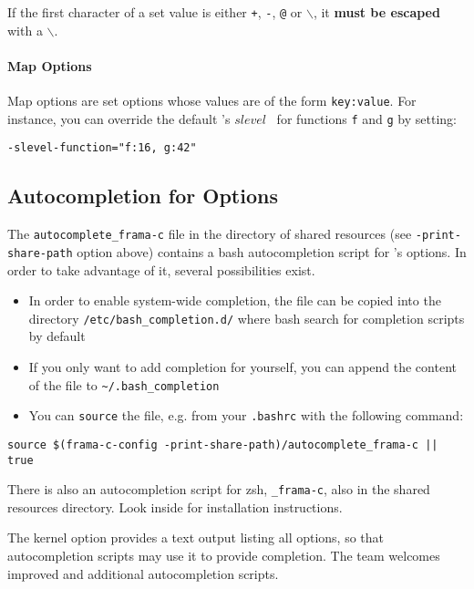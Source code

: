 \begin{important}
If the first character of a set value is either \texttt{+}, \texttt{-},
\texttt{@} or $\backslash$, it \textbf{must be escaped} with a $\backslash$.
\end{important}

\paragraph{Map Options}

Map options are set options whose values are of the form \texttt{key:value}. For
instance, you can override the default \Value's $slevel$~\cite{value} for
functions \texttt{f} and \texttt{g} by setting:
\begin{commands}
\texttt{-slevel-function="f:16, g:42"}
\end{commands}

\subsection{Autocompletion for Options}

The \texttt{autocomplete\_frama-c} file in the directory of shared resources
(see \texttt{-print-share-path} option above) contains a
bash autocompletion script for \FramaC's options. In order to take advantage
of it, several possibilities exist.
\begin{itemize}
\item In order to enable system-wide completion, the file can be copied
  into the directory \texttt{/etc/bash\_completion.d/} where bash search for
  completion scripts by default
\item If you only want to add completion for yourself, you can append the
content of the file to \texttt{\~{}/.bash\_completion}
\item You can \texttt{source} the file, e.g. from your \texttt{.bashrc} with
the following command:
\end{itemize}
\begin{verbatim}
source $(frama-c-config -print-share-path)/autocomplete_frama-c || true
\end{verbatim}


There is also an autocompletion script for zsh, \texttt{\_frama-c}, also
in the shared resources directory. Look inside for installation instructions.

The kernel option  provides a text output listing
all \FramaC options, so that autocompletion scripts may use it to provide
completion. The \FramaC team welcomes improved and additional autocompletion
scripts.

